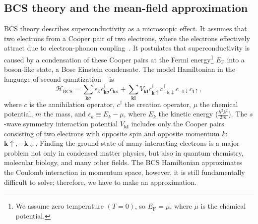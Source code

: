 \subsection{BCS theory and the mean-field approximation}\label{sec:BCS-theory}
BCS theory describes superconductivity as a microscopic effect.
It assumes that two electrons from a Cooper pair of two electrons, where the electrons effectively attract due to electron-phonon coupling~\cite{Cooper1956,Bardeen1957,Bardeen1957a}.
It postulates that superconductivity is caused by a condensation of these Cooper pairs at the Fermi energy\footnote{We assume zero temperature $\left(T=0\right)$, so $E_{\textrm{F}}=\mu$, where $\mu$ is the chemical potential.} $E_{\textrm{F}}$ into a boson-like state, a Bose Einstein condensate.
The model Hamiltonian in the language of second quantization ~\cite{Gennes1999} is
\begin{equation}
\mathcal{H}_{\textrm{BCS}}=\sum_{\bm{k}\sigma}\epsilon_{\bm{k}}c_{\bm{k}\sigma}^{\dagger}c_{\bm{k}\sigma}+\sum_{\bm{k}\bm{l}}V_{\bm{k}\bm{l}}c_{\bm{k}\uparrow}^{\dagger}c_{-\bm{k}\downarrow}^{\dagger}c_{-\bm{l}\downarrow}c_{\bm{l}\uparrow},\label{eq:BCS}
\end{equation}
where $c$ is the annihilation operator, $c^{\dagger}$ the creation operator, $\mu$ the chemical potential, $m$ the mass, and $\epsilon_{k} \equiv E_{k}-\mu$, where $E_{k}$ the kinetic energy ($\frac{\hbar^{2}k^{2}}{2m}$).
The $s$-wave symmetry interaction potential $V_{\bm{kl}}$ includes only the Cooper pairs consisting of two electrons with opposite spin and opposite momentum $k$: $\bm{\bm{k}}\uparrow,-\bm{k}\downarrow$.
Finding the ground state of many interacting electrons is a major problem not only in condensed matter physics, but also in quantum chemistry, molecular biology, and many other fields.
The BCS Hamiltonian approximates the Coulomb interaction in momentum space, however, it is still fundamentally difficult to solve; therefore, we have to make an approximation.

